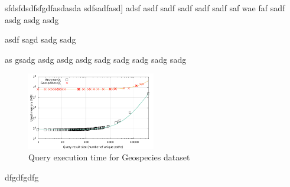 sfdsfdsdfsfgdfasdasda sdfsadfasd] adsf asdf sadf sadf sadf sadf saf wae faf sadf asdg asdg asdg 

 asdf sagd sadg sadg 

 as gsadg asdg asdg asdg sadg sadg sadg sadg sadg 

\begin{figure}[h]
  \begin{center}
    \includegraphics[width=0.5\textwidth]{data/mem_per_paths_SCO.pdf}
    \caption{Query execution time for Geospecies dataset}
    \label{fig:mem_per_paths_SCO}
  \end{center}
\end{figure}


dfgdfgdfg
